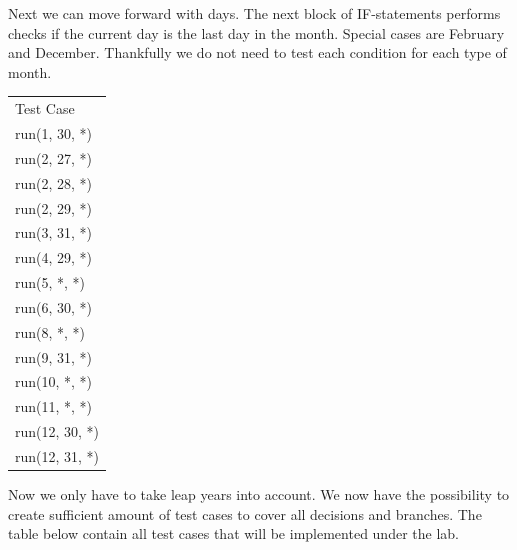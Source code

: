 \documentclass[a4paper]{article}
\begin{document}
Next we can move forward with days. The next block of IF-statements performs checks if the current day is the last day in the month. Special cases are February and December. Thankfully we do not need to test each condition for each type of month.  

\begin{table}[h]
	\begin{tabular}{l}
		Test Case\\
		run(1, 30, *)\\
		run(2, 27, *)\\
		run(2, 28, *)\\
		run(2, 29, *)\\
		run(3, 31, *)\\
		run(4, 29, *)\\
		run(5, *, *)\\
		run(6, 30, *)\\
		run(8, *, *)\\
		run(9, 31, *)\\
		run(10, *, *)\\
		run(11, *, *)\\
		run(12, 30, *)\\
		run(12, 31, *)\\
	\end{tabular}
\end{table}
\newpage
Now we only have to take leap years into account. We now have the possibility to create sufficient amount of test cases to cover all decisions and branches. The table below contain all test cases that will be implemented under the lab.
\end{document}
